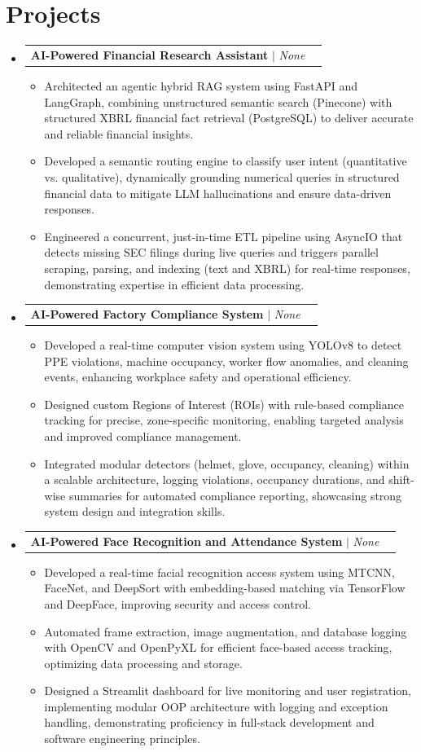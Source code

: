 \documentclass[letterpaper,11pt]{article}
\makeatletter
\newcommand{\resumeItem}[1]{
  \item\small{
    {#1 \vspace{-2pt}}
  }
}
\newcommand{\resumeProjectHeading}[2]{
    \item
    \begin{tabular*}{0.97\textwidth}{l@{\extracolsep{\fill}}r}
      \small#1 & #2 \\
    \end{tabular*}\vspace{-7pt}
}
\newcommand{\resumeSubHeadingListStart}{\begin{itemize}[leftmargin=0.15in, label={}]}
\newcommand{\resumeSubHeadingListEnd}{\end{itemize}}
\newcommand{\resumeItemListStart}{\begin{itemize}}
\newcommand{\resumeItemListEnd}{\end{itemize}\vspace{-5pt}}
\makeatother
\begin{document}
\section{Projects}
    \resumeSubHeadingListStart
            \resumeProjectHeading
          {\textbf{AI-Powered Financial Research Assistant} $|$ \emph{None}}{}
          \resumeItemListStart
                        \resumeItem{Architected an agentic hybrid RAG system using FastAPI and LangGraph, combining unstructured semantic search (Pinecone) with structured XBRL financial fact retrieval (PostgreSQL) to deliver accurate and reliable financial insights.}
                        \resumeItem{Developed a semantic routing engine to classify user intent (quantitative vs. qualitative), dynamically grounding numerical queries in structured financial data to mitigate LLM hallucinations and ensure data-driven responses.}
                        \resumeItem{Engineered a concurrent, just-in-time ETL pipeline using AsyncIO that detects missing SEC filings during live queries and triggers parallel scraping, parsing, and indexing (text and XBRL) for real-time responses, demonstrating expertise in efficient data processing.}
                      \resumeItemListEnd
            \resumeProjectHeading
          {\textbf{AI-Powered Factory Compliance System} $|$ \emph{None}}{}
          \resumeItemListStart
                        \resumeItem{Developed a real-time computer vision system using YOLOv8 to detect PPE violations, machine occupancy, worker flow anomalies, and cleaning events, enhancing workplace safety and operational efficiency.}
                        \resumeItem{Designed custom Regions of Interest (ROIs) with rule-based compliance tracking for precise, zone-specific monitoring, enabling targeted analysis and improved compliance management.}
                        \resumeItem{Integrated modular detectors (helmet, glove, occupancy, cleaning) within a scalable architecture, logging violations, occupancy durations, and shift-wise summaries for automated compliance reporting, showcasing strong system design and integration skills.}
                      \resumeItemListEnd
            \resumeProjectHeading
          {\textbf{AI-Powered Face Recognition and Attendance System} $|$ \emph{None}}{}
          \resumeItemListStart
                        \resumeItem{Developed a real-time facial recognition access system using MTCNN, FaceNet, and DeepSort with embedding-based matching via TensorFlow and DeepFace, improving security and access control.}
                        \resumeItem{Automated frame extraction, image augmentation, and database logging with OpenCV and OpenPyXL for efficient face-based access tracking, optimizing data processing and storage.}
                        \resumeItem{Designed a Streamlit dashboard for live monitoring and user registration, implementing modular OOP architecture with logging and exception handling, demonstrating proficiency in full-stack development and software engineering principles.}
                      \resumeItemListEnd
          \resumeSubHeadingListEnd
\end{document}
